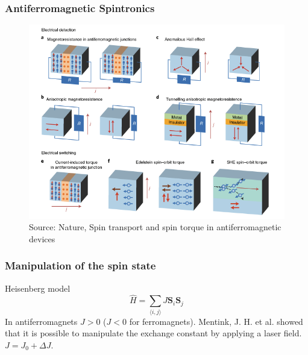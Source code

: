 \documentclass{beamer}
\begin{document}
\begin{frame}
\frametitle{Antiferromagnetic Spintronics}

\begin{figure}
  \begin{minipage}[c]{0.6\textwidth}
    \includegraphics[width=\textwidth]{../Figures/afm_device.png}
  \end{minipage}\hfill
  \begin{minipage}[c]{0.2\textwidth}
    \caption{Source: Nature, Spin transport and spin torque in antiferromagnetic devices} \label{fig:2}
  \end{minipage}
\end{figure}

\end{frame}


\begin{frame}
\frametitle{Manipulation of the spin state}
\begin{block}{Heisenberg model}
\begin{equation} 
\hat{H} = \sum_{\langle i,j \rangle} J \boldsymbol{S}_i \boldsymbol{S}_j \nonumber
\end{equation}
In antiferromagnets $J > 0$ ($J < 0$ for ferromagnets). Mentink, J. H. et al. showed that it is possible to manipulate the exchange constant by applying a laser field. $J = J_0 + \Delta J$.
\end{block}
\end{frame}

\end{document}
